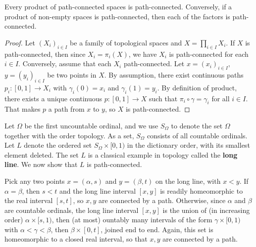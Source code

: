 \begin{proposition}\label{topo space path-connected product iff}
Every product of path-connected spaces is path-connected. Conversely, if a product of non-empty spaces is path-connected, then each of the factors is path-connected.
\end{proposition}
\begin{proof}
Let $(X_i)_{i\in I}$ be a family of topological spaces and $X=\prod_{i\in I}X_i$. If $X$ is path-connected, then since $X_i=\pi_i(X)$, we have $X_i$ is path-connected for each $i\in I$. Conversely, assume that each $X_i$ path-connected. Let $x=(x_i)_{i\in I}$, $y=(y_i)_{i\in I}$ be two points in $X$. By assumption, there exist continuous paths $p_i:[0,1]\to X_i$ with $\gamma_i(0)=x_i$ and $\gamma_i(1)=y_i$. By definition of product, there exists a unique continuous $p:[0,1]\to X$ such that $\pi_i\circ\gamma=\gamma_i$ for all $i\in I$. That makes $p$ a path from $x$ to $y$, so $X$ is path-connected.
\end{proof}
\begin{example}
Let $\Omega$ be the first uncountable ordinal, and we use $S_\Omega$ to denote the set $\Omega$ together with the order topology. As a set, $S_\Omega$ consists of all countable ordinals. Let $L$ denote the ordered set $S_\Omega\times[0,1)$ in the dictionary order, with its smallest element deleted. The set $L$ is a classical example in topology called the \textbf{long line}. We now show that $L$ is path-connected.\par
Pick any two points $x=(\alpha,s)$ and $y=(\beta,t)$ on the long line, with $x<y$. If $\alpha=\beta$, then $s<t$ and the long line interval $[x,y]$ is readily homeomorphic to the real interval $[s,t]$, so $x,y$ are connected by a path. Otherwise, since $\alpha$ and $\beta$ are countable ordinals, the long line interval $[x,y]$ is the union of (in increasing order) $\alpha\times[s,1)$, then (at most)  ountably many intervals of the form $\gamma\times[0,1)$ with $\alpha<\gamma<\beta$, then $\beta\times[0,t]$, joined end to end. Again, this set is homeomorphic to a closed real interval, so that $x,y$ are connected by a path.
\end{example}
